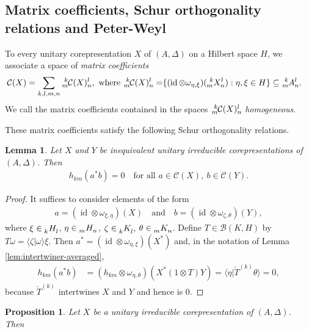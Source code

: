 \documentclass[11pt]{article}
\DeclareMathOperator{\id}{id}
\newcommand{\Gr}[5]{\tensor*[^{#2}_{#4}]{#1}{^{#3}_{#5}}}%
\newcommand{\Grd}[3]{\Gr{#1}{}{}{#2}{#3}}
\newtheorem{Lem}[Theorem]{Lemma}
\newtheorem{Prop}[Theorem]{Proposition}
\theoremstyle{definition}
\numberwithin{equation}{section}
\begin{document}
\subsection{Matrix coefficients, Schur orthogonality relations and Peter-Weyl}


To every unitary corepresentation $X$ of $(A,\Delta)$ on a Hilbert space $H$, we associate a space
of \emph{matrix coefficients}
\begin{align*}
\mathcal{C}(X) = \sum_{k,l,m,n}  \Gr{\mathcal{C}(X)}{k}{l}{m}{n},
\text{ where } \Gr{\mathcal{C}(X)}{k}{l}{m}{n} = \span \{ (\id \otimes
  \omega_{\eta,\xi})(\Gr{X}{k}{l}{m}{n}) : \eta,\xi \in H\} \subseteq
  \Gr{A}{k}{l}{m}{n}.
\end{align*}
We call the matrix coefficients contained in the spaces $\Gr{\mathcal{C}(X)}{k}{l}{m}{n}$
\emph{homogeneous}.

These matrix coefficients satisfy the following Schur orthogonality relations.
\begin{Lem}
  Let $X$ and $Y$ be inequivalent unitary irreducible corepresentations of $(A,\Delta)$. Then
  \begin{align*}
    h_{km}(a^{*}b) = 0 \quad \text{for all } a\in \mathcal{C}(X), \ b\in \mathcal{C}(Y).
  \end{align*}
\end{Lem}
\begin{proof}
It suffices to  consider elements of the form
  \begin{align*}
    a = (\id\otimes \omega_{\xi,\eta})(X) \quad\text{and}  \quad b=(\id \otimes \omega_{\zeta,\theta})(Y),
  \end{align*}
  where $\xi \in \Grd{H}{k}{l}$, $\eta\in \Grd{H}{m}{n}$, $\zeta \in \Grd{K}{k}{l}$, $\theta \in
  \Grd{K}{m}{n}$. Define $T\in \mathcal{B}(K,H)$ by $T\omega = \langle \zeta|\omega\rangle \xi$. 
  Then $a^{*}=(\id \otimes \omega_{\eta,\xi})(X^{*})$ and, in the notation of Lemma \ref{lem:intertwiner-averaged},
  \begin{align*}
    h_{km}(a^{*}b) &= (h_{km} \otimes \omega_{\eta,\theta})(X^{*}(1\otimes T)Y) 
 = \langle \eta|
     \check{T}^{(k)} \theta\rangle = 0,
  \end{align*}
  because $\check{T}^{(k)}$ intertwines $X$  and $Y$  and hence is $0$.
\end{proof}

\begin{Prop}
  Let $X$ be a unitary irreducible corepresentation of $(A,\Delta)$. Then
\end{Prop}
\end{document}
